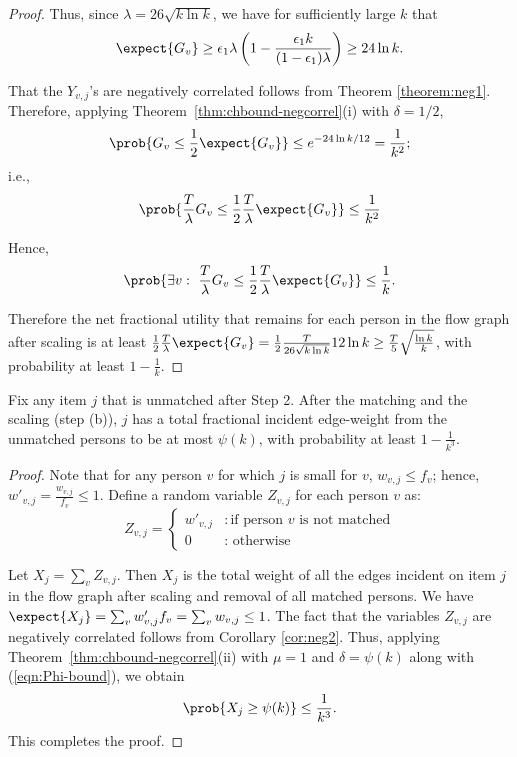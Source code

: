 \begin{proof}
Thus, since $\lambda = 26 \sqrt{k \ln k}$, we have for sufficiently large $k$ that
\[ \expect{G_{v}} \geq \epsilon_1\lambda \left(1-\frac{\epsilon_1 k}{(1-\epsilon_1)\lambda}\right) \geq 24\ln{k}. \]

That the $Y_{v,j}$'s are negatively correlated follows from Theorem \ref{theorem:neg1}. Therefore, applying Theorem~\ref{thm:chbound-negcorrel}(i)
with $\delta = 1/2$,
\[ \prob{G_v \leq \frac{1}{2} \expect{G_v}} \leq e^{-24\ln{k}/12} = \frac{1}{k^2}; \]
i.e.,
 \begin{equation*}
\prob{\frac{T}{\lambda}G_v \leq \frac{1}{2} \frac{T}{\lambda}\expect{G_v}} \leq \frac{1}{k^2}
\end{equation*}

Hence,
 \begin{equation*}
\prob{\exists v: ~\frac{T}{\lambda}G_v \leq \frac{1}{2} \frac{T}{\lambda}\expect{G_v}} \leq \frac{1}{k}.
\end{equation*}

Therefore the net fractional utility that remains for each person  in the flow graph after scaling is at least $ \frac{1}{2} \frac{T}{\lambda}\expect{G_v}= \frac{1}{2} \frac{T}{26\sqrt{k\ln{k}}}12\ln{k} \geq \frac{T}{5}\sqrt{\frac{\ln{k}}{k}}$, with probability at least $1-\frac{1}{k}$.
\end{proof}

\begin{lemma}
\label{lemma:item}
Fix any item $j$ that is unmatched after Step 2. After the matching and the scaling (step (b)), $j$ has a total fractional incident edge-weight
from the unmatched persons to be at most $\psi(k)$,  with probability at least $1-\frac{1}{k^3}$.
\end{lemma}

\begin{proof}
Note that for any person $v$ for which $j$ is small for $v$, $w_{v,j} \leq f_{v}$; hence,
$w'_{v,j}=\frac{w_{v,j}}{f_{v}}\leq 1$. Define a random variable $Z_{v,j}$ for each person $v$ as:
\begin{equation}
\label{eqn:itemdef}
Z_{v,j} = \begin{cases} w'_{v,j} &: \text{if person $v$ is not matched} \\
0 &: \text{ otherwise} \end{cases}
\end{equation}

Let $X_{j}=\sum_{v} Z_{v,j}$. Then $X_{j}$ is the total weight of all the edges incident on item $j$ in the flow graph
after scaling and removal of all matched persons. We have $\expect{X_{j}}= \sum_{v}w'_{v,j} f_{v}=\sum_{v} w_{v,j} \leq 1$.
The fact that the variables $Z_{v,j}$ are negatively correlated follows from Corollary \ref{cor:neg2}. Thus, applying
Theorem~\ref{thm:chbound-negcorrel}(ii) with $\mu = 1$ and $\delta = \psi(k)$ along with (\ref{eqn:Phi-bound}), we obtain
\[
\prob{X_{j} \geq \psi(k)} \leq \frac{1}{k^3}.
\]
This completes the proof.
\end{proof}

